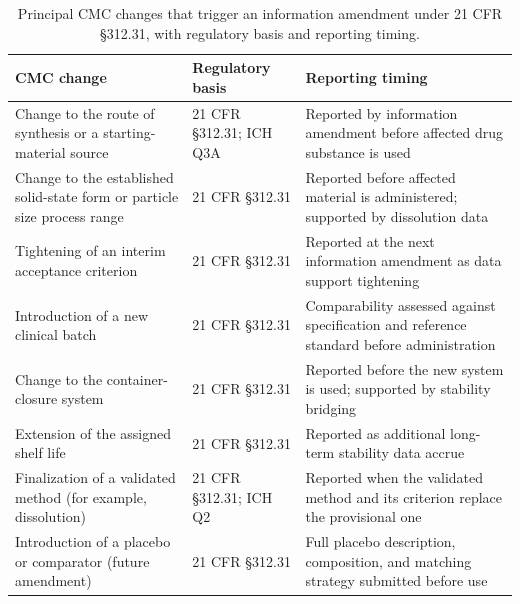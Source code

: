 \begin{table}[t]
\centering
\caption{Principal CMC changes that trigger an information amendment under 21 CFR
\S 312.31, with regulatory basis and reporting timing.}
\label{tab:cmc-change-control}
\begin{tabularx}{\textwidth}{L{4.4cm} L{3.6cm} Y}
\toprule
\textbf{CMC change} & \textbf{Regulatory basis} & \textbf{Reporting timing} \\
\midrule
Change to the route of synthesis or a starting-material source & 21 CFR \S 312.31; ICH Q3A & Reported by information amendment before affected drug substance is used \\
Change to the established solid-state form or particle size process range & 21 CFR \S 312.31 & Reported before affected material is administered; supported by dissolution data \\
Tightening of an interim acceptance criterion & 21 CFR \S 312.31 & Reported at the next information amendment as data support tightening \\
Introduction of a new clinical batch & 21 CFR \S 312.31 & Comparability assessed against specification and reference standard before administration \\
Change to the container-closure system & 21 CFR \S 312.31 & Reported before the new system is used; supported by stability bridging \\
Extension of the assigned shelf life & 21 CFR \S 312.31 & Reported as additional long-term stability data accrue \\
Finalization of a validated method (for example, dissolution) & 21 CFR \S 312.31; ICH Q2 & Reported when the validated method and its criterion replace the provisional one \\
Introduction of a placebo or comparator (future amendment) & 21 CFR \S 312.31 & Full placebo description, composition, and matching strategy submitted before use \\
\bottomrule
\end{tabularx}
\vspace*{-0.2cm}
\end{table}

